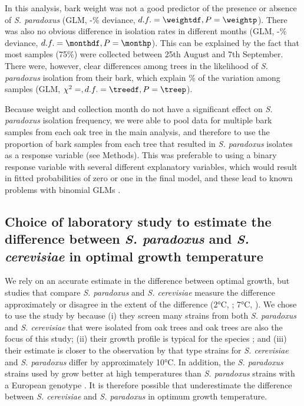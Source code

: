 \documentclass[12pt]{article}
\begin{document}
In this analysis, bark weight was not a good predictor of the presence or absence of \textit{S. paradoxus} (GLM, -\weightpcentdev\% deviance, $d.f.=\weightdf, P=\weightp$). There was also no obvious difference in isolation rates in different months (GLM, -\monthpcentdev\% deviance, $d.f.=\monthdf, P=\monthp$). This can be explained by the fact that most samples (75\%) were collected between 25th August and 7th September. There were, however, clear differences among trees in the likelihood of \textit{S. paradoxus} isolation from their bark, which explain \treepcentdev\% of the variation among samples (GLM, $\chi^2=, d.f.=\treedf, P=\treep$). 

Because weight and collection month do not have a significant effect on \textit{S. paradoxus} isolation frequency, we were able to pool data for multiple bark samples from each oak tree in the main analysis, and therefore to use the proportion of bark samples from each tree that resulted in \textit{S. paradoxus} isolates as a response variable (see Methods). This was preferable to using a binary response variable with several different explanatory variables, which would result in fitted probabilities of zero or one in the final model, and these lead to known problems with binomial GLMs \citep{venables_modern_2002}. 

\subsection*{Choice of laboratory study to estimate the difference between \textit{S. paradoxus} and \textit{S. cerevisiae} in optimal growth temperature}

We rely on an accurate estimate in the difference between optimal growth, but studies that compare \textit{S. paradoxus} and \textit{S. cerevisiae} measure the difference approximately \citep{liti_population_2009,leducq_local_2014} or disagree in the extent of the difference (2\si{\degreeCelsius}, \citealp{salvado_temperature_2011}; 7\si{\degreeCelsius}, \citealp{sweeney_sympatric_2004}). We chose to use the study by \citet{sweeney_sympatric_2004} because (i) they screen many strains from both \textit{S. paradoxus} and \textit{S. cerevisiae} that were isolated from oak trees and oak trees are also the focus of this study; (ii) their growth profile is typical for the species \citep{liti_population_2009}; and (iii) their estimate is closer to the observation by \citet{leducq_local_2014} that type strains for \textit{S. cerevisiae} and \textit{S. paradoxus} differ by approximately 10\si{\degreeCelsius}. In addition, the \textit{S. paradoxus} strains used by \citet{sweeney_sympatric_2004} grow better at high temperatures than \textit{S. paradoxus} strains with a European genotype \citep{leducq_local_2014}. It is therefore possible that \citet{sweeney_sympatric_2004} underestimate the difference between \textit{S. cerevisiae} and \textit{S. paradoxus} in optimum growth temperature.
\end{document}
